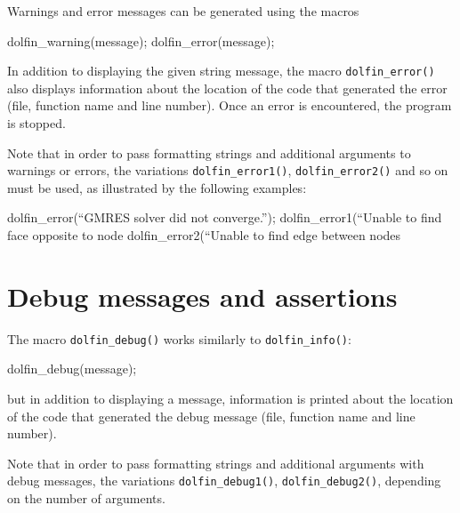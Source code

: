 Warnings and error messages can be generated using the macros
\begin{code}
  dolfin_warning(message);
  dolfin_error(message);
\end{code}

In addition to displaying the given string message, the macro
\texttt{dolfin\_error()} also displays information about the location
of the code that generated the error (file, function name and line
number). Once an error is encountered, the program is stopped.

Note that in order to pass formatting strings and additional arguments
to warnings or errors, the variations \texttt{dolfin\_error1()},
\texttt{dolfin\_error2()} and so on must be used, as illustrated by
the following examples:
\footnotesize
\begin{code}
  dolfin_error(``GMRES solver did not converge.'');
  dolfin_error1(``Unable to find face opposite to node %
  dolfin_error2(``Unable to find edge between nodes %
\end{code}
\normalsize

\section{Debug messages and assertions}

The macro \texttt{dolfin\_debug()} works similarly to
\texttt{dolfin\_info()}:
\begin{code}
  dolfin_debug(message);
\end{code}
but in addition to displaying a message, information is printed about
the location of the code that generated the debug message (file,
function name and line number).

Note that in order to pass formatting strings and additional arguments
with debug messages, the variations \texttt{dolfin\_debug1()},
\texttt{dolfin\_debug2()}, depending on the number of arguments.

